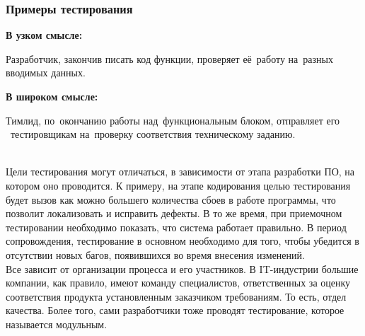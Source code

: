 \documentclass{../industrial-development}
\begin{document}
\begin{frame} \frametitle{Примеры тестирования}
	\begin{minipage}{0.44\textwidth}
		\textbf{В узком смысле:}
		
		Разработчик, закончив писать код функции, проверяет её~работу на~разных вводимых данных.
	\end{minipage}
	\hfill
	\begin{minipage}{0.52\textwidth}
		\textbf{В широком смысле:}
		
		Тимлид, по~окончанию работы над~функциональным блоком, отправляет его ~тестировщикам на~проверку соответствия техническому заданию.
	\end{minipage}
\end{frame}
\\Цели тестирования могут отличаться, в зависимости от этапа разработки ПО, на котором оно проводится. К примеру, на этапе кодирования целью тестирования будет вызов как можно большего количества сбоев в работе программы, что позволит локализовать и исправить дефекты. В то же время, при приемочном тестировании необходимо показать, что система работает правильно. В период сопровождения, тестирование в основном необходимо для того, чтобы убедится в отсутствии новых багов, появившихся во время внесения изменений.\\
Все зависит от организации процесса и его участников. В IT-индустрии большие компании, как правило, имеют команду специалистов, ответственных за оценку соответствия продукта установленным заказчиком требованиям. То есть, отдел качества. Более того, сами разработчики тоже проводят тестирование, которое называется модульным. 
\end{document}
